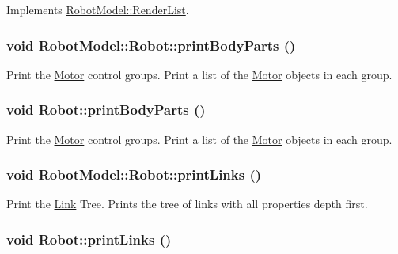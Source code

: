 Implements \hyperlink{class_robot_model_1_1_render_list_a78436c997913ce9ad41a9bd1da9b3d96}{RobotModel::RenderList}.\hypertarget{class_robot_model_1_1_robot_abb43fb469172e7ff9ce37a7211a81175}{
\subsubsection[{printBodyParts}]{\setlength{\rightskip}{0pt plus 5cm}void RobotModel::Robot::printBodyParts ()}}
\label{class_robot_model_1_1_robot_abb43fb469172e7ff9ce37a7211a81175}


Print the \hyperlink{class_robot_model_1_1_motor}{Motor} control groups. Print a list of the \hyperlink{class_robot_model_1_1_motor}{Motor} objects in each group. \hypertarget{class_robot_model_1_1_robot_ad67fe62de4ea2b7b6da0521fc0bf0e5a}{
\subsubsection[{printBodyParts}]{\setlength{\rightskip}{0pt plus 5cm}void Robot::printBodyParts ()}}
\label{class_robot_model_1_1_robot_ad67fe62de4ea2b7b6da0521fc0bf0e5a}


Print the \hyperlink{class_robot_model_1_1_motor}{Motor} control groups. Print a list of the \hyperlink{class_robot_model_1_1_motor}{Motor} objects in each group. \hypertarget{class_robot_model_1_1_robot_a064e5fce550bb3427fb36c2f43e34000}{
\subsubsection[{printLinks}]{\setlength{\rightskip}{0pt plus 5cm}void RobotModel::Robot::printLinks ()}}
\label{class_robot_model_1_1_robot_a064e5fce550bb3427fb36c2f43e34000}


Print the \hyperlink{class_robot_model_1_1_link}{Link} Tree. Prints the tree of links with all properties depth first. \hypertarget{class_robot_model_1_1_robot_a791f90ebca15e9a1e61e9e903f7dc594}{
\subsubsection[{printLinks}]{\setlength{\rightskip}{0pt plus 5cm}void Robot::printLinks ()}}
\label{class_robot_model_1_1_robot_a791f90ebca15e9a1e61e9e903f7dc594}


